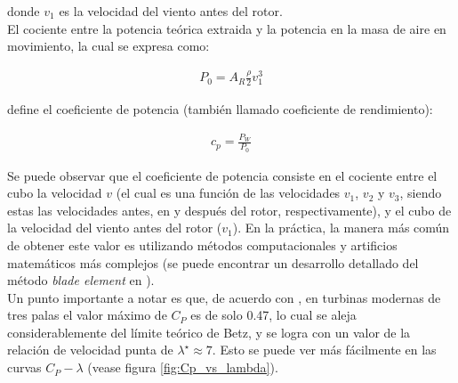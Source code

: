 {donde $v_1$ es la velocidad del viento antes del rotor.
\\

El cociente entre la potencia teórica extraida y la potencia en la masa de aire en movimiento, la cual se expresa como:

\begin{align}
    P_0 = A_R\frac{\rho}{2}v_1^3
\end{align}

define el coeficiente de potencia (también llamado coeficiente de rendimiento):

\begin{align}
    c_p = \frac{P_W}{P_0}
\end{align}

Se puede observar que el coeficiente de potencia consiste en el cociente entre el cubo la velocidad $v$ 
(el cual es una función de las velocidades $v_1$, $v_2$ y $v_3$, siendo estas las velocidades antes, en 
y después del rotor, respectivamente), y el cubo de la velocidad del viento antes del rotor ($v_1$). En 
la práctica, la manera más común de obtener este valor es utilizando métodos 
computacionales y artificios matemáticos más complejos (se puede encontrar un desarrollo detallado del 
método \emph{blade element} en \cite{heier2014}).
\\

Un punto importante a notar es que, de acuerdo con \cite{Burton2011}, en turbinas modernas de tres palas 
el valor máximo de $C_P$ es de solo 0.47, lo cual se aleja considerablemente del límite teórico de Betz, 
y se logra con un valor de la 
relación de velocidad punta de $\lambda^\star \approx 7$. Esto se puede ver más fácilmente en las curvas 
$C_P - \lambda$ (vease figura \ref{fig:Cp_vs_lambda}). 
\begin{figure}
\end{figure}}
